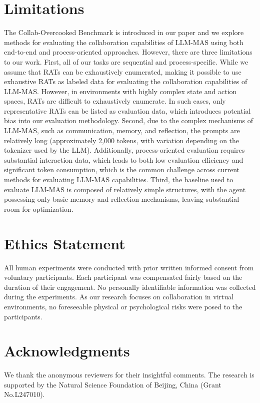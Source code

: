 \documentclass[11pt]{article}
\begin{document}



\section*{Limitations}


The Collab-Overcooked Benchmark is introduced in our paper and we explore methods for evaluating the collaboration capabilities of LLM-MAS using both end-to-end and process-oriented approaches. However, there are three limitations to our work. First, all of our tasks are sequential and process-specific. While we assume that RATs can be exhaustively enumerated, making it possible to use exhaustive RATs as labeled data for evaluating the collaboration capabilities of LLM-MAS. However, in environments with highly complex state and action spaces, RATs are difficult to exhaustively enumerate. In such cases, only representative RATs can be listed as evaluation data, which introduces potential bias into our evaluation methodology. Second, due to the complex mechanisms of LLM-MAS, such as communication, memory, and reflection, the prompts are relatively long (approximately 2,000 tokens, with variation depending on the tokenizer used by the LLM). Additionally, process-oriented evaluation requires substantial interaction data, which leads to both low evaluation efficiency and significant token consumption, which is the common challenge across current methods for evaluating LLM-MAS capabilities. Third, the baseline used to evaluate LLM-MAS is composed of relatively simple structures, with the agent possessing only basic memory and reflection mechanisms, leaving substantial room for optimization.


\section*{Ethics Statement}

All human experiments were conducted with prior written informed consent from voluntary participants. Each participant was compensated fairly based on the duration of their engagement. No personally identifiable information was collected during the experiments. As our research focuses on collaboration in virtual environments, no foreseeable physical or psychological risks were posed to the participants.

\section*{Acknowledgments}
We thank the anonymous reviewers for their insightful comments. The research is supported by the Natural Science Foundation of Beijing, China (Grant No.L247010).
\end{document}
